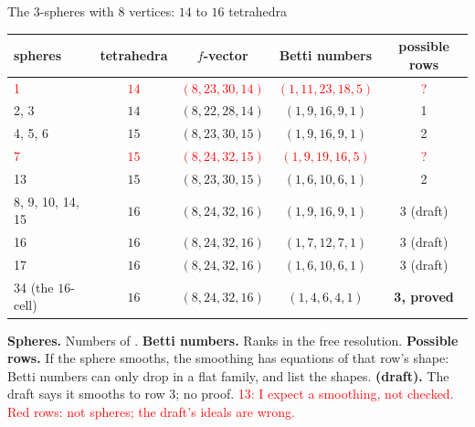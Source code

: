 \begin{frame}{The \(3\)-spheres with \(8\) vertices: \(14\) to \(16\) tetrahedra}
{\centering\small
\renewcommand{\arraystretch}{1.0}\setlength{\tabcolsep}{5pt}
\begin{tabular}{lcccc}
spheres & tetrahedra & \(f\)-vector & Betti numbers & possible rows\\ \hline
\textcolor{red}{1} & \textcolor{red}{\(14\)} & \textcolor{red}{\((8,23,30,14)\)} & \textcolor{red}{\((1,11,23,18,5)\)} & \textcolor{red}{?}\\
2, 3 & \(14\) & \((8,22,28,14)\) & \((1,9,16,9,1)\) & 1\\
4, 5, 6 & \(15\) & \((8,23,30,15)\) & \((1,9,16,9,1)\) & 2\\
\textcolor{red}{7} & \textcolor{red}{\(15\)} & \textcolor{red}{\((8,24,32,15)\)} & \textcolor{red}{\((1,9,19,16,5)\)} & \textcolor{red}{?}\\
13 & \(15\) & \((8,23,30,15)\) & \((1,6,10,6,1)\) & 2\\
8, 9, 10, 14, 15 & \(16\) & \((8,24,32,16)\) & \((1,9,16,9,1)\) & 3 (draft)\\
16 & \(16\) & \((8,24,32,16)\) & \((1,7,12,7,1)\) & 3 (draft)\\
17 & \(16\) & \((8,24,32,16)\) & \((1,6,10,6,1)\) & 3 (draft)\\
34 (the \(16\)-cell) & \(16\) & \((8,24,32,16)\) & \((1,4,6,4,1)\) & \textbf{3, proved}\\
\end{tabular}\par}\smallskip
{\footnotesize \textbf{Spheres.} Numbers of \cite{GS}. \textbf{Betti numbers.} Ranks in the free resolution. \textbf{Possible rows.} If the sphere smooths, the smoothing has equations of that row's shape: Betti numbers can only drop in a flat family, and \cite{SSY} list the shapes. \textbf{(draft).} The draft says it smooths to row 3; no proof. \textcolor{red}{13: I expect a smoothing, not checked. Red rows: not spheres; the draft's ideals are wrong.}\par}
\end{frame}

